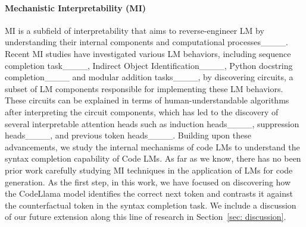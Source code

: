 {\paragraph{Mechanistic Interpretability (MI)} MI is a subfield of interpretability that aims to reverse-engineer LM by understanding their internal components and computational processes____. Recent MI studies have investigated various LM behaviors, including sequence completion task____, Indirect Object Identification____, Python docstring completion____ and modular addition tasks____, by discovering circuits, a subset of LM components responsible for implementing these LM behaviors. These circuits can be explained in terms of human-understandable algorithms after interpreting the circuit components, which has led to the discovery of several interpretable attention heads such as induction heads____, suppression heads____, and previous token heads____. Building upon these advancements, we study the internal mechanisms of code LMs to understand the syntax completion capability of Code LMs. As far as we know, there has no been prior work carefully studying MI techniques in the application of LMs for code generation. As the first step, in this work, we have focused on discovering how the CodeLlama model identifies the correct next token and contrasts it against the counterfactual token in the syntax completion task. We include a discussion of our future extension along this line of research in Section~\ref{sec: discussion}.}